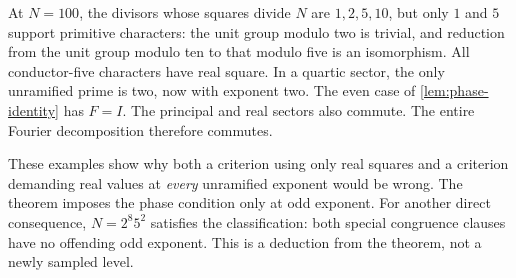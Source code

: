 At \(N=100\), the divisors whose squares divide \(N\) are
\(1,2,5,10\), but only \(1\) and \(5\) support primitive
characters: the unit group modulo two is trivial, and reduction
from the unit group modulo ten to that modulo five is an
isomorphism. All conductor-five characters have real square.
In a quartic sector, the only unramified prime is two, now
with exponent two. The even case of \cref{lem:phase-identity}
has \(F=I\). The principal and real sectors also commute.
The entire Fourier decomposition therefore commutes.

These examples show why both a criterion using only real squares
and a criterion demanding real values at \emph{every} unramified
exponent would be wrong. The theorem imposes the phase condition
only at odd exponent. For another direct consequence,
\(N=2^8 5^2\) satisfies the classification: both special
congruence clauses have no offending odd exponent. This is
a deduction from the theorem, not a newly sampled level.
